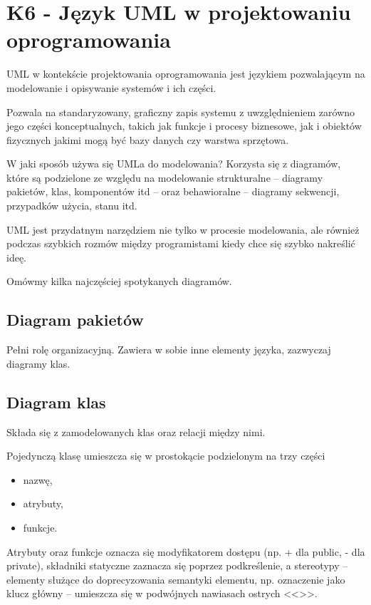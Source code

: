 \section{K6 - Język UML w projektowaniu oprogramowania}

UML w kontekście projektowania oprogramowania jest językiem pozwalającym na modelowanie i opisywanie systemów i ich części.

Pozwala na standaryzowany, graficzny zapis systemu z uwzględnieniem zarówno jego części konceptualnych, takich jak funkcje i procesy biznesowe, jak i obiektów fizycznych jakimi mogą być bazy danych czy warstwa sprzętowa.

W jaki sposób używa się UMLa do modelowania? Korzysta się z diagramów, które są podzielone ze względu na modelowanie strukturalne -- diagramy pakietów, klas, komponentów itd -- oraz behawioralne -- diagramy sekwencji, przypadków użycia, stanu itd.

UML jest przydatnym narzędziem nie tylko w procesie modelowania, ale również podczas szybkich rozmów między programistami kiedy chce się szybko nakreślić ideę.

Omówmy kilka najczęściej spotykanych diagramów.

\subsection{Diagram pakietów}
Pełni rolę organizacyjną. Zawiera w sobie inne elementy języka, zazwyczaj diagramy klas.

\subsection{Diagram klas}
Składa się z zamodelowanych klas oraz relacji między nimi.

Pojedynczą klasę umieszcza się w prostokącie podzielonym na trzy części
\begin{itemize}
	\item{nazwę,}
	\item{atrybuty,}
	\item{funkcje.}
\end{itemize}

Atrybuty oraz funkcje oznacza się modyfikatorem dostępu (np. + dla public, - dla private), składniki statyczne zaznacza się poprzez podkreślenie, a stereotypy -- elementy służące do doprecyzowania semantyki elementu, np. oznaczenie jako klucz główny -- umieszcza się w podwójnych nawiasach ostrych <<>>.


